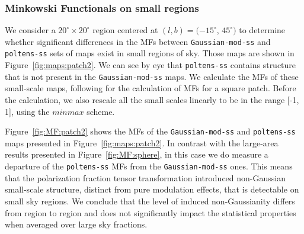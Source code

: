 \documentclass[twocolumn]{aastex631}
\begin{document}
\subsubsection{Minkowski Functionals on small regions}
We consider a $20^{\circ}\times20^{\circ}$ region centered at $(l, b) = (-15^{\circ}$, $45^{\circ})$ to determine whether significant differences in the MFs between \texttt{Gaussian-mod-ss} and \texttt{poltens-ss} sets of maps exist in small regions of sky. Those maps are shown in Figure~\ref{fig:maps:patch2}. We can see by eye that \texttt{poltens-ss} contains structure that is not present in the \texttt{Gaussian-mod-ss} maps. We calculate the MFs of these small-scale maps, following \cite{Mantz:2008} for the calculation of MFs for a square patch. Before the calculation, we also rescale all the small scales linearly to be in the range [-1, 1], using the $minmax$ scheme.

Figure~\ref{fig:MF:patch2} shows the MFs of the \texttt{Gaussian-mod-ss} and \texttt{poltens-ss} maps presented in Figure~\ref{fig:maps:patch2}. In contrast with the large-area results presented in Figure~\ref{fig:MF:sphere}, in this case we do measure a departure of the \texttt{poltens-ss} MFs from the \texttt{Gaussian-mod-ss} ones. %
This means that the polarization fraction tensor transformation introduced non-Gaussian small-scale structure, distinct from pure modulation effects, that is detectable on small sky regions. 
We conclude that the level of induced non-Gaussianity differs from region to region and does not significantly impact the statistical properties when averaged over large sky fractions.

\end{document}
